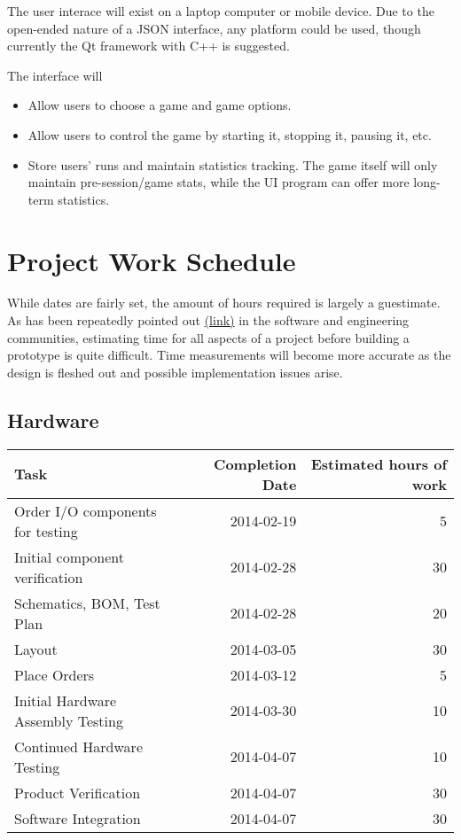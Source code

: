 \documentclass{article}
\begin{document}
The user interace will exist on a laptop computer or mobile device.
Due to the open-ended nature of a JSON interface, any platform could be used, though currently the Qt framework
with C++ is suggested.

The interface will
\begin{itemize}
\item Allow users to choose a game and game options.
\item Allow users to control the game by starting it, stopping it, pausing it, etc.
\item Store users' runs and maintain statistics tracking. The game itself will only maintain pre-session/game stats,
	while the UI program can offer more long-term statistics.
\end{itemize}

\section{Project Work Schedule}

While dates are fairly set, the amount of hours required is largely a guestimate.
As has been repeatedly pointed out \href{http://en.wikipedia.org/wiki/Waterfall_method#Criticism}{(link)} in the software
and engineering communities,
estimating time for all aspects of a project before building a prototype is quite difficult.
Time measurements will become more accurate as the design is fleshed out and possible implementation issues arise.

\subsection{Hardware}

\begin{tabular}{|l|r|r|}
\hline
\textbf{Task} & \textbf{Completion Date} & \textbf{Estimated hours of work} \\
\hline
Order I/O components for testing & 2014-02-19 & 5 \\
\hline
Initial component verification & 2014-02-28 & 30 \\
\hline
Schematics, BOM, Test Plan & 2014-02-28 & 20 \\
\hline
Layout & 2014-03-05 & 30 \\
\hline
Place Orders & 2014-03-12 & 5 \\
\hline
Initial Hardware Assembly Testing & 2014-03-30 & 10 \\
\hline
Continued Hardware Testing & 2014-04-07 & 10 \\
\hline
Product Verification & 2014-04-07 & 30 \\
\hline
Software Integration & 2014-04-07 & 30 \\
\hline
\end{tabular}
\end{document}
